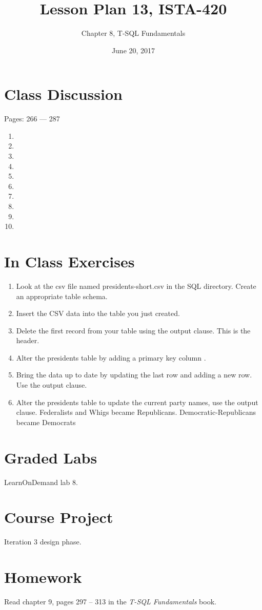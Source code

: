 \documentclass{article}
\title{Lesson Plan 13, ISTA-420}
\author{Chapter 8, T-SQL Fundamentals}
\date{June 20, 2017}
\begin{document}
    

    \maketitle{}

    \section{Class Discussion}

    Pages: 266 --- 287

    \begin{enumerate}
        \item 
        \item 
        \item 
        \item 
        \item 
        \item 
        \item 
        \item 
        \item 
        \item 
    \end{enumerate}

    \section{In Class Exercises}


    \begin{enumerate}
\item Look at the csv file named presidents-short.csv in the SQL directory. Create an appropriate table schema.

\item Insert the CSV data into the table you just created.

\item Delete the first record from your table using the output clause. This is the header.

\item Alter the presidents table by adding a primary key column .

\item Bring the data up to date by updating the last row and adding a new row. Use the output clause.

\item Alter the presidents table to update the current party names, use the output clause.  Federalists and Whigs became Republicans.  Democratic-Republicans became Democrats
    \end{enumerate}

    \section{Graded Labs}

    LearnOnDemand lab 8.

    \section{Course Project}

    Iteration 3 design phase.

    \section{Homework}

        Read chapter 9, pages 297  -- 313  in the \textit{T-SQL Fundamentals} book.
        
\end{document}
